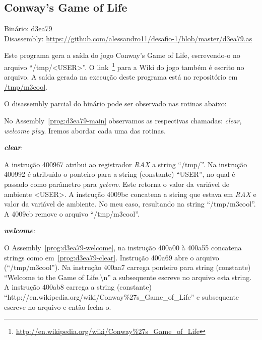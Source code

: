 \subsection{Conway's Game of Life}
\noindent Binário: \href{https://s3.amazonaws.com/chaordic-desafio-cloud/d3ea79}{d3ea79}\\
Disassembly: \href{https://github.com/alessandro11/desafio-1/blob/master/d3ea79.as}{https://github.com/alessandro11/desafio-1/blob/master/d3ea79.as}

Este programa gera a saída do jogo Conway's Game of Life,
escrevendo-o no arquivo ``/tmp/<USER>''. O
link~\footnote{\href{http://en.wikipedia.org/wiki/Conway\%27s\_Game\_of\_Life}{http://en.wikipedia.org/wiki/Conway\%27s\_Game\_of\_Life}}
para a Wiki do jogo também é escrito no arquivo. A saída gerada na
execução deste programa está no repositório em
\href{https://github.com/alessandro11/desafio-1/blob/master/m3cool}{/tmp/m3cool}.

O disassembly parcial do binário pode ser observado nas rotinas abaixo:



No Assembly~\ref{prog:d3ea79-main} observamos as respectivas chamadas:
\emph{clear}, \emph{welcome} \emph{play}. Iremos abordar cada uma das rotinas.\\

\par\textbf{\emph{clear}}:


A instrução 400967 atribui ao registrador \emph{RAX}
a string ``/tmp/''. Na instrução 400992 é atribuído o ponteiro para a
string (constante) ``USER'', no qual é passado como parâmetro para
\emph{getenv}. Este retorna o valor da variável de ambiente <USER>.
A instrução 4009bc concatena a string que estava em \emph{RAX} e valor da
variável de ambiente. No meu caso, resultando na string
``/tmp/m3cool''. A 4009cb remove o arquivo ``/tmp/m3cool''.\\

\par\textbf{\emph{welcome}}:


O Assembly~\ref{prog:d3ea79-welcome}, na instrução 400a00 à 400a55
concatena strings como em~\ref{prog:d3ea79-clear}. Instrução 400a69
abre o arquivo (``/tmp/m3cool''). Na instrução 400aa7 carrega ponteiro
para string (constante) ``Welcome to the Game of Life.\textbackslash n'' a
subsequente escreve no arquivo esta string. A instrução 400ab8 carrega a
string (constante) ``http://en.wikipedia.org/wiki/Conway\%27s\_Game\_of\_Life'' e
subsequente escreve no arquivo e então fecha-o.\\


